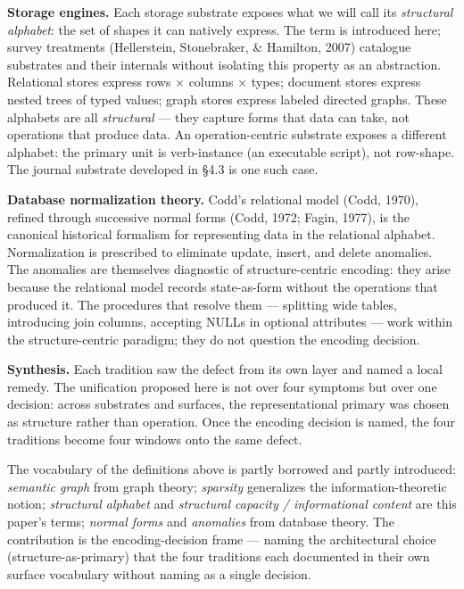 \documentclass[
]{article}
\begin{document}
\textbf{Storage engines.} Each storage substrate exposes what we will
call its \emph{structural alphabet}: the set of shapes it can natively
express. The term is introduced here; survey treatments (Hellerstein,
Stonebraker, \& Hamilton, 2007) catalogue substrates and their internals
without isolating this property as an abstraction. Relational stores
express rows × columns × types; document stores express nested trees of
typed values; graph stores express labeled directed graphs. These
alphabets are all \emph{structural} --- they capture forms that data can
take, not operations that produce data. An operation-centric substrate
exposes a different alphabet: the primary unit is verb-instance (an
executable script), not row-shape. The journal substrate developed in
§4.3 is one such case.

\textbf{Database normalization theory.} Codd's relational model (Codd,
1970), refined through successive normal forms (Codd, 1972; Fagin,
1977), is the canonical historical formalism for representing data in
the relational alphabet. Normalization is prescribed to eliminate
update, insert, and delete anomalies. The anomalies are themselves
diagnostic of structure-centric encoding: they arise because the
relational model records state-as-form without the operations that
produced it. The procedures that resolve them --- splitting wide tables,
introducing join columns, accepting NULLs in optional attributes ---
work within the structure-centric paradigm; they do not question the
encoding decision.

\textbf{Synthesis.} Each tradition saw the defect from its own layer and
named a local remedy. The unification proposed here is not over four
symptoms but over one decision: across substrates and surfaces, the
representational primary was chosen as structure rather than operation.
Once the encoding decision is named, the four traditions become four
windows onto the same defect.

The vocabulary of the definitions above is partly borrowed and partly
introduced: \emph{semantic graph} from graph theory; \emph{sparsity}
generalizes the information-theoretic notion; \emph{structural alphabet}
and \emph{structural capacity / informational content} are this paper's
terms; \emph{normal forms} and \emph{anomalies} from database theory.
The contribution is the encoding-decision frame --- naming the
architectural choice (structure-as-primary) that the four traditions
each documented in their own surface vocabulary without naming as a
single decision.
\end{document}
